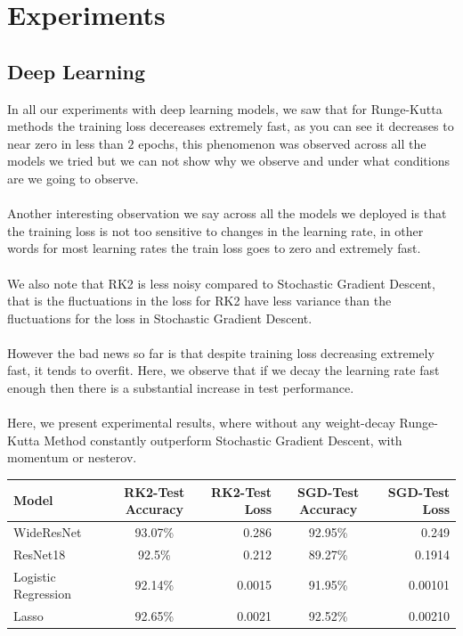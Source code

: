 \section{Experiments}
\subsection{Deep Learning}
In all our experiments with deep learning models, we saw that for Runge-Kutta methods the training loss decereases extremely fast, as you can see it decreases to near zero in less than $2$ epochs, this phenomenon was observed across all the models we tried but we can not show why we observe and under what conditions are we going to observe.
\\
\\
Another interesting observation we say across all the models we deployed is that the training loss is not too sensitive to changes in the learning rate, in other words for most learning rates the train loss goes to zero and extremely fast.
\\
\\
We also note that RK2 is less noisy compared to Stochastic Gradient Descent, that is the fluctuations in the loss for RK2 have less variance than the fluctuations for the loss in Stochastic Gradient Descent.
\\
\\
However the bad news so far is that despite training loss decreasing extremely fast, it tends to overfit. Here, we observe that if we decay the learning rate fast enough then there is a substantial increase in test performance.
\\
\\
Here, we present experimental results, where without any weight-decay Runge-Kutta Method constantly outperform Stochastic Gradient Descent, with momentum or nesterov.
\begin{center}
  \begin{tabular}{ | l | c | r| c | r| }
    \hline
    Model & RK2-Test Accuracy & RK2-Test Loss & SGD-Test Accuracy & SGD-Test Loss \\ \hline
    WideResNet & 93.07\% & 0.286 & 92.95\% & 0.249 \\ \hline
    ResNet18 & 92.5\% & 0.212 & 89.27\% & 0.1914 \\ \hline
    Logistic Regression & 92.14\% & 0.0015 & 91.95\% & 0.00101 \\ \hline
    Lasso & 92.65\% & 0.0021  & 92.52\% & 0.00210  \\ \hline
    \hline
  \end{tabular}
\end{center}

